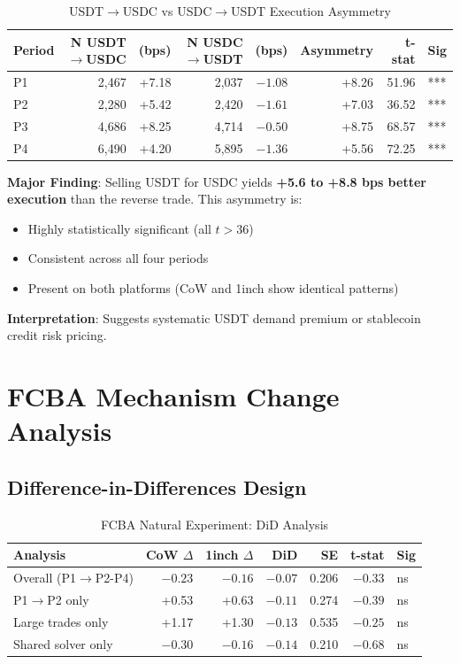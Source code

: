 \documentclass[11pt,a4paper]{article}
\begin{document}
\begin{table}[H]
\centering
\caption{USDT$\rightarrow$USDC vs USDC$\rightarrow$USDT Execution Asymmetry}
\begin{tabular}{lrrrrrrl}
\toprule
\textbf{Period} & \textbf{N USDT$\rightarrow$USDC} & \textbf{(bps)} & \textbf{N USDC$\rightarrow$USDT} & \textbf{(bps)} & \textbf{Asymmetry} & \textbf{t-stat} & \textbf{Sig} \\
\midrule
P1 & 2,467 & +7.18 & 2,037 & $-1.08$ & +8.26 & 51.96 & *** \\
P2 & 2,280 & +5.42 & 2,420 & $-1.61$ & +7.03 & 36.52 & *** \\
P3 & 4,686 & +8.25 & 4,714 & $-0.50$ & +8.75 & 68.57 & *** \\
P4 & 6,490 & +4.20 & 5,895 & $-1.36$ & +5.56 & 72.25 & *** \\
\bottomrule
\end{tabular}
\end{table}

\textbf{Major Finding}: Selling USDT for USDC yields \textbf{+5.6 to +8.8 bps better execution} than the reverse trade. This asymmetry is:
\begin{itemize}
    \item Highly statistically significant (all $t > 36$)
    \item Consistent across all four periods
    \item Present on both platforms (CoW and 1inch show identical patterns)
\end{itemize}

\textbf{Interpretation}: Suggests systematic USDT demand premium or stablecoin credit risk pricing.

\section{FCBA Mechanism Change Analysis}

\subsection{Difference-in-Differences Design}

\begin{table}[H]
\centering
\caption{FCBA Natural Experiment: DiD Analysis}
\begin{tabular}{lrrrrrl}
\toprule
\textbf{Analysis} & \textbf{CoW $\Delta$} & \textbf{1inch $\Delta$} & \textbf{DiD} & \textbf{SE} & \textbf{t-stat} & \textbf{Sig} \\
\midrule
Overall (P1$\rightarrow$P2-P4) & $-0.23$ & $-0.16$ & $-0.07$ & 0.206 & $-0.33$ & ns \\
P1$\rightarrow$P2 only & +0.53 & +0.63 & $-0.11$ & 0.274 & $-0.39$ & ns \\
Large trades only & +1.17 & +1.30 & $-0.13$ & 0.535 & $-0.25$ & ns \\
Shared solver only & $-0.30$ & $-0.16$ & $-0.14$ & 0.210 & $-0.68$ & ns \\
\bottomrule
\end{tabular}
\end{table}
\end{document}
